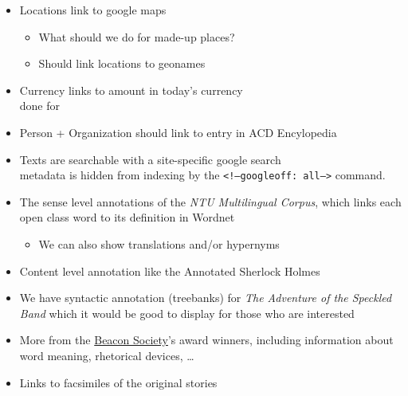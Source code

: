 \documentclass[a4paper,landscape,headrule,footrule,xetex]{foils}
\newcommand{\todo}{\marginpar{ToDo}}
\begin{document}
\begin{itemize}
\item Locations link to google maps
  \begin{itemize}
  \item What should we do for made-up places?\task
  \item Should link locations to geonames\todo
  \end{itemize}
\item Currency links to amount in today's currency
  \\ done for 
\item Person + Organization should link to entry in ACD Encylopedia
\item  Texts are searchable with a site-specific google search
  \\ metadata is hidden from indexing by the \texttt{<!--googleoff: all-->} command.
\end{itemize}



 \begin{itemize}
  \item The sense level annotations of the \textit{NTU Multilingual Corpus}, which links each open class word to its definition in Wordnet%
    \begin{itemize}
    \item We can also show translations and/or hypernyms
    \end{itemize}
  \item Content level annotation like the Annotated Sherlock Holmes

  \item We have syntactic annotation (treebanks) for \textit{The Adventure of the Speckled Band} which it would be good to display for those who are interested

  \item More from the \href{http://www.beaconsociety.com/}{Beacon
      Society}'s award winners, including information about word
    meaning, rhetorical devices, \ldots

  \item Links to facsimiles of the original stories

\end{itemize}

\end{document}
